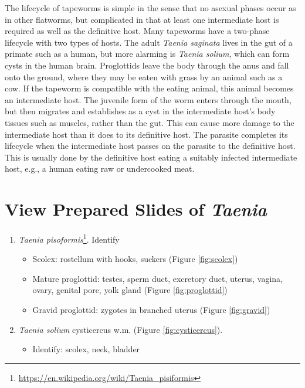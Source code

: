 \documentclass[]{book}
\providecommand{\tightlist}{%
  \setlength{\itemsep}{0pt}\setlength{\parskip}{0pt}}
\let\rmarkdownfootnote\footnote%
\def\footnote{\protect\rmarkdownfootnote}
\renewcommand{\href}[2]{#2\footnote{\url{#1}}}
\theoremstyle{definition}
\theoremstyle{definition}
\theoremstyle{definition}
\theoremstyle{remark}
\begin{document}
The lifecycle of tapeworms is simple in the sense that no asexual phases
occur as in other flatworms, but complicated in that at least one
intermediate host is required as well as the definitive host. Many
tapeworms have a two-phase lifecycle with two types of hosts. The adult
\emph{Taenia saginata} lives in the gut of a primate such as a human, but more
alarming is \emph{Taenia solium}, which can form cysts in the human brain.
Proglottids leave the body through the anus and fall onto the ground,
where they may be eaten with grass by an animal such as a cow. If the
tapeworm is compatible with the eating animal, this animal becomes an
intermediate host. The juvenile form of the worm enters through the
mouth, but then migrates and establishes as a cyst in the intermediate
host's body tissues such as muscles, rather than the gut. This can cause
more damage to the intermediate host than it does to its definitive
host. The parasite completes its lifecycle when the intermediate host
passes on the parasite to the definitive host. This is usually done by
the definitive host eating a suitably infected intermediate host, e.g.,
a human eating raw or undercooked meat.

\section{\texorpdfstring{View Prepared Slides of
\emph{Taenia}}{View Prepared Slides of Taenia}}\label{view-prepared-slides-of-taenia}

\begin{enumerate}
\def\labelenumi{\arabic{enumi}.}
\tightlist
\item
  \href{https://en.wikipedia.org/wiki/Taenia_pisiformis}{\emph{Taenia
  pisoformis}}. Identify

  \begin{itemize}
  \tightlist
  \item
    Scolex: rostellum with hooks, suckers (Figure \ref{fig:scolex})
  \item
    Mature proglottid: testes, sperm duct, excretory duct, uterus,
    vagina, ovary, genital pore, yolk gland (Figure
    \ref{fig:proglottid})
  \item
    Gravid proglottid: zygotes in branched uterus (Figure
    \ref{fig:gravid})
  \end{itemize}
\item
  \emph{Taenia solium} cysticercus w.m. (Figure \ref{fig:cysticercus}).

  \begin{itemize}
  \tightlist
  \item
    Identify: scolex, neck, bladder
  \end{itemize}
\end{enumerate}
\end{document}
